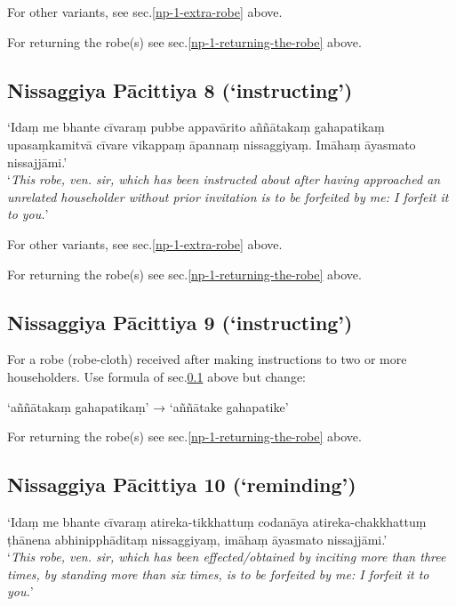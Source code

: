 For other variants, see sec.\ref{np-1-extra-robe} above.

For returning the robe(s) see sec.\ref{np-1-returning-the-robe} above.

\subsection{Nissaggiya Pācittiya 8 (‘instructing’)}
\label{np-8-instructing}

‘Idaṃ me bhante cīvaraṃ pubbe appavārito aññātakaṃ gahapatikaṃ upasaṃkamitvā
cīvare vikappaṃ āpannaṃ nissaggiyaṃ. Imāhaṃ āyasmato nissajjāmi.’\\
‘\emph{This robe, ven. sir, which has been instructed about after having
  approached an unrelated householder without prior invitation is to be
  forfeited by me: I forfeit it to you.}’


For other variants, see sec.\ref{np-1-extra-robe} above.

For returning the robe(s) see sec.\ref{np-1-returning-the-robe} above.

\subsection{Nissaggiya Pācittiya 9 (‘instructing’)}

For a robe (robe-cloth) received after making instructions to two or more
householders. Use formula of sec.\ref{np-8-instructing} above but change:

‘aññātakaṃ gahapatikaṃ’ → ‘aññātake gahapatike’

For returning the robe(s) see sec.\ref{np-1-returning-the-robe} above.


\subsection{Nissaggiya Pācittiya 10 (‘reminding’)}

‘Idaṃ me bhante cīvaraṃ atireka-tikkhattuṃ codanāya atireka-chakkhattuṃ ṭhānena
abhinipphāditaṃ nissaggiyaṃ, imāhaṃ āyasmato nissajjāmi.’\\
‘\emph{This robe, ven. sir, which has been effected/obtained by inciting more
  than three times, by standing more than six times, is to be forfeited by me: I
  forfeit it to you.}’


